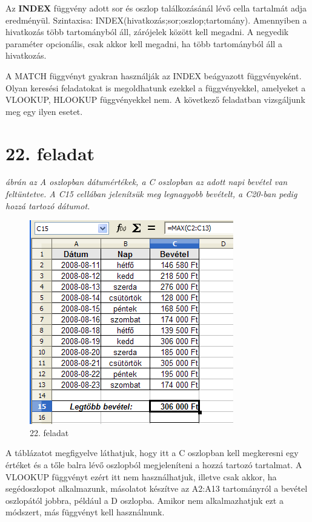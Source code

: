 Az \textbf{INDEX} függvény adott sor és oszlop
találkozásánál lévő cella tartalmát adja
eredményül. Szintaxisa: INDEX(hivatkozás;sor;oszlop;tartomány).
Amennyiben a hivatkozás több tartományból  áll,
zárójelek között kell megadni. A negyedik paraméter
opcionális, csak akkor kell megadni, ha  több tartományból
áll a hivatkozás.

A MATCH függvényt gyakran használják az INDEX beágyazott
függvényeként. Olyan keresési feladatokat is megoldhatunk
ezekkel a függvényekkel, amelyeket a VLOOKUP, HLOOKUP
függvényekkel nem. A következő feladatban vizsgáljunk meg
egy ilyen esetet.


\section{22. feladat}

{\itshape
{} ábrán az A oszlopban dátumértékek, a C oszlopban az
adott napi bevétel van feltüntetve. A C15 cellában jelenítsük
meg legnagyobb bevételt, a C20-ban pedig hozzá tartozó
dátumot.}

\begin{figure}[!h]
\begin{center}
\includegraphics[width=8.888cm]{oocalcv1-img102.png}
\caption{22. feladat}\label{22-feladat}
\end{center}
\end{figure}

A táblázatot megfigyelve láthatjuk, hogy itt a C oszlopban kell
megkeresni egy értéket és a tőle balra lévő oszlopból
megjeleníteni a hozzá tartozó tartalmat. A VLOOKUP függvényt
ezért itt nem használhatjuk, illetve csak akkor, ha segédoszlopot
alkalmazunk, másolatot készítve az A2:A13 tartományról a
bevétel oszlopától jobbra, például a D oszlopba. Amikor nem
alkalmazhatjuk ezt a módszert, más függvényt kell
használnunk.

